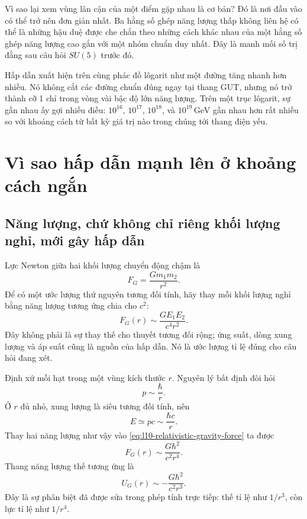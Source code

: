 Vì sao lại xem vùng lân cận của một điểm gặp nhau là cơ bản? Đó là nơi đầu vào có thể trở nên đơn giản nhất. Ba hằng số ghép năng lượng thấp không liên hệ có thể là những hậu duệ được che chắn theo những cách khác nhau của một hằng số ghép năng lượng cao gắn với một nhóm chuẩn duy nhất. Đây là manh mối số trị đằng sau câu hỏi \(SU(5)\) trước đó.

Hấp dẫn xuất hiện trên cùng phác đồ lôgarit như một đường tăng nhanh hơn nhiều. Nó không cắt các đường chuẩn đúng ngay tại thang GUT, nhưng nó trở thành cỡ 1 chỉ trong vòng vài bậc độ lớn năng lượng. Trên một trục lôgarit, sự gần nhau ấy gợi nhiều điều: \(10^{16}\), \(10^{17}\), \(10^{18}\), và
\(10^{19}\,\mathrm{GeV}\) gần nhau hơn rất nhiều so với khoảng cách từ bất kỳ giá trị nào trong chúng tới thang điện yếu.

\section{Vì sao hấp dẫn mạnh lên ở khoảng cách ngắn}

\subsection{Năng lượng, chứ không chỉ riêng khối lượng nghỉ, mới gây hấp dẫn}

Lực Newton giữa hai khối lượng chuyển động chậm là
\begin{equation}
  F_G=\frac{Gm_1m_2}{r^2}.
  \label{eq:l10-newton-force}
\end{equation}
Để có một ước lượng thứ nguyên tương đối tính, hãy thay mỗi khối lượng nghỉ bằng năng lượng tương ứng chia cho \(c^2\):
\begin{equation}
  F_G(r)\sim\frac{GE_1E_2}{c^4r^2}.
  \label{eq:l10-relativistic-gravity-force}
\end{equation}
Đây không phải là sự thay thế cho thuyết tương đối rộng; ứng suất, dòng xung lượng và áp suất cũng là nguồn của hấp dẫn. Nó là ước lượng tỉ lệ đúng cho câu hỏi đang xét.

Định xứ mỗi hạt trong một vùng kích thước \(r\). Nguyên lý bất định đòi hỏi
\begin{equation}
  p\sim\frac{\hbar}{r}.
  \label{eq:l10-localization-momentum}
\end{equation}
Ở \(r\) đủ nhỏ, xung lượng là siêu tương đối tính, nên
\begin{equation}
  E\simeq pc\sim\frac{\hbar c}{r}.
  \label{eq:l10-localization-energy}
\end{equation}
Thay hai năng lượng như vậy vào
\eqref{eq:l10-relativistic-gravity-force} ta được
\begin{equation}
  F_G(r)
  \sim
  \frac{G\hbar^2}{c^2r^4}.
  \label{eq:l10-short-distance-gravity-force}
\end{equation}
Thang năng lượng thế tương ứng là
\begin{equation}
  U_G(r)\sim-\frac{G\hbar^2}{c^2r^3}.
  \label{eq:l10-short-distance-gravity-potential}
\end{equation}
Đây là sự phân biệt đã được sửa trong phép tính trực tiếp:
thế tỉ lệ như \(1/r^3\), còn lực tỉ lệ như \(1/r^4\).

